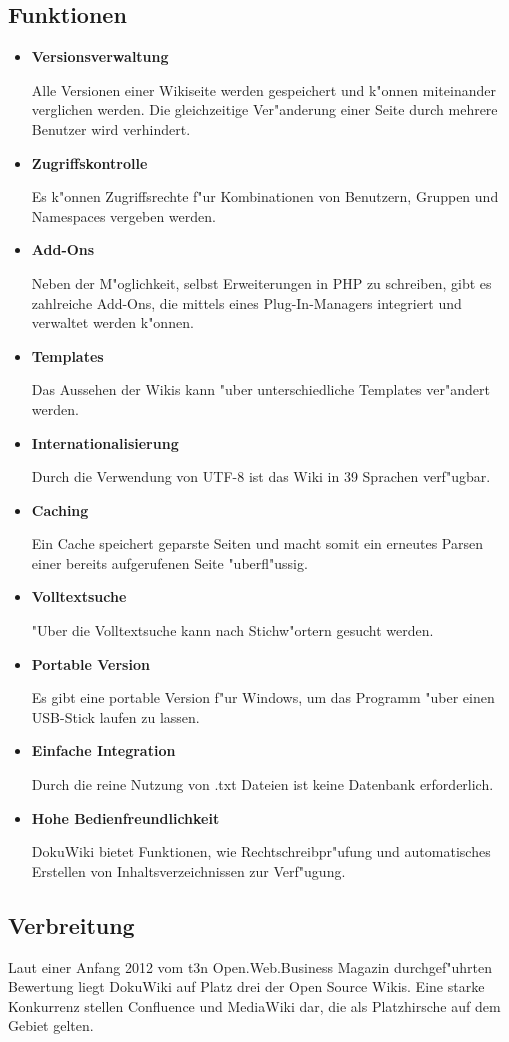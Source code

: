 \subsection{Funktionen}
\begin{itemize}
\item \textbf{Versionsverwaltung}

Alle Versionen einer Wikiseite werden gespeichert und k"onnen miteinander verglichen werden. Die gleichzeitige Ver"anderung einer Seite durch mehrere Benutzer wird verhindert.
\item \textbf{Zugriffskontrolle}

Es k"onnen Zugriffsrechte f"ur Kombinationen von Benutzern, Gruppen und Namespaces vergeben werden.
\item \textbf{Add-Ons}

Neben der M"oglichkeit, selbst Erweiterungen in PHP zu schreiben, gibt es zahlreiche Add-Ons, die mittels eines Plug-In-Managers integriert und verwaltet werden k"onnen.
\item \textbf{Templates}

Das Aussehen der Wikis kann "uber unterschiedliche Templates ver"andert werden.
\item \textbf{Internationalisierung}

Durch die Verwendung von UTF-8 ist das Wiki in 39 Sprachen verf"ugbar.
\item \textbf{Caching}

Ein Cache speichert geparste Seiten und macht somit ein erneutes Parsen einer bereits aufgerufenen Seite "uberfl"ussig.
\item \textbf{Volltextsuche}

"Uber die Volltextsuche kann nach Stichw"ortern gesucht werden.
\item \textbf{Portable Version}

Es gibt eine portable Version f"ur Windows, um das Programm "uber einen USB-Stick laufen zu lassen.
\item \textbf{Einfache Integration}

Durch die reine Nutzung von .txt Dateien ist keine Datenbank erforderlich.
\item \textbf{Hohe Bedienfreundlichkeit}

DokuWiki bietet Funktionen, wie Rechtschreibpr"ufung und automatisches Erstellen von Inhaltsverzeichnissen zur Verf"ugung. 
\end{itemize}

\subsection{Verbreitung}
Laut einer Anfang 2012 vom t3n Open.Web.Business Magazin durchgef"uhrten Bewertung liegt DokuWiki auf Platz drei der Open Source Wikis. Eine starke Konkurrenz stellen Confluence und MediaWiki dar, die als Platzhirsche auf dem Gebiet gelten.
